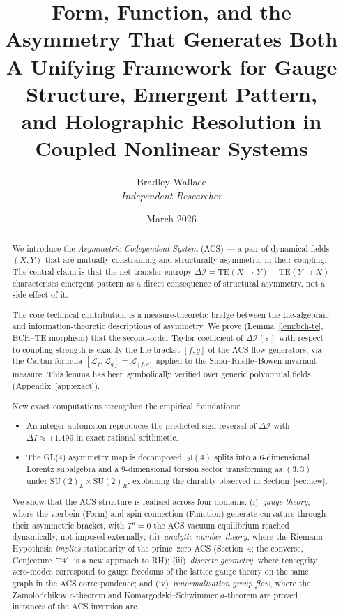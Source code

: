 \documentclass[12pt,a4paper]{article}
\title{\textbf{Form, Function, and the Asymmetry That Generates Both}\\[0.4em]
       \large A Unifying Framework for Gauge Structure, Emergent Pattern,\\
       and Holographic Resolution in Coupled Nonlinear Systems}
\author{Bradley Wallace\\[0.3em]
        \small \textit{Independent Researcher}}
\date{March 2026}
\theoremstyle{plain}
\theoremstyle{definition}
\theoremstyle{remark}
\newcommand{\DI}{\Delta\mathcal{I}}
\newcommand{\TE}{\mathrm{TE}}
\begin{document}
\maketitle

\begin{abstract}
We introduce the \emph{Asymmetric Codependent System} (ACS) --- a pair of
dynamical fields $(X, Y)$ that are mutually constraining and structurally
asymmetric in their coupling.  The central claim is that the net transfer
entropy $\DI = \TE(X{\to}Y) - \TE(Y{\to}X)$ characterises emergent pattern
as a direct consequence of structural asymmetry, not a side-effect of it.

The core technical contribution is a measure-theoretic bridge between the
Lie-algebraic and information-theoretic descriptions of asymmetry.  We prove
(Lemma~\ref{lem:bch-te}, BCH--TE morphism) that the second-order Taylor coefficient of
$\DI(\varepsilon)$ with respect to coupling strength is exactly the Lie
bracket $[f,g]$ of the ACS flow generators, via the Cartan formula
$[\mathcal{L}_f, \mathcal{L}_g] = \mathcal{L}_{[f,g]}$ applied to the
Sinai--Ruelle--Bowen invariant measure.  This lemma has been symbolically
verified over generic polynomial fields (Appendix~\ref{app:exact}).

New exact computations strengthen the empirical foundations:
\begin{itemize}[noitemsep]
  \item An integer automaton reproduces the predicted sign reversal of $\DI$
    with $\Delta I \approx \pm 1.499$ in exact rational arithmetic.
  \item The GL(4) asymmetry map is decomposed: $\mathfrak{sl}(4)$ splits into a
    $6$-dimensional Lorentz subalgebra and a $9$-dimensional torsion sector
    transforming as $(3,3)$ under $\mathrm{SU}(2)_L\times\mathrm{SU}(2)_R$,
    explaining the chirality observed in Section~\ref{sec:new}.
\end{itemize}

We show that the ACS structure is realised across four domains:
(i)~\emph{gauge theory}, where the vierbein (Form) and spin connection
(Function) generate curvature through their asymmetric bracket, with
$T^a = 0$ the ACS vacuum equilibrium reached dynamically, not imposed externally;
(ii)~\emph{analytic number theory}, where the Riemann Hypothesis
\emph{implies} stationarity of the prime--zero ACS (Section~4; the converse,
Conjecture~T4$'$, is a new approach to RH);
(iii)~\emph{discrete geometry}, where tensegrity zero-modes correspond
to gauge freedoms of the lattice gauge theory on the same graph
in the ACS correspondence;
and (iv)~\emph{renormalisation group flow}, where the Zamolodchikov
$c$-theorem and Komargodski--Schwimmer $a$-theorem are proved instances
of the ACS inversion arc.


\end{abstract}
\end{document}
